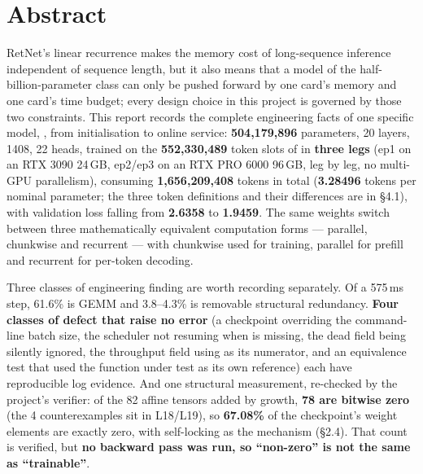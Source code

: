 \documentclass[11pt,openany]{article}
\begin{document}
\clearpage

\section*{Abstract}

RetNet's linear recurrence makes the memory cost of long-sequence inference independent of
sequence length, but it also means that a model of the half-billion-parameter class can only be
pushed forward by one card's memory and one card's time budget; every design choice in this
project is governed by those two constraints. This report records the complete engineering facts
of one specific model, , from initialisation to online
service: \textbf{504{,}179{,}896} parameters, 20 layers,  1408, 22 heads, trained
on the \textbf{552{,}330{,}489} token slots of  in \textbf{three
legs} (ep1 on an RTX 3090 24\,GB, ep2/ep3 on an RTX PRO 6000 96\,GB, leg by leg, no multi-GPU
parallelism), consuming \textbf{1{,}656{,}209{,}408} tokens in total (\textbf{3.28496} tokens per
nominal parameter; the three token definitions and their differences are in \S4.1), with
validation loss falling from \textbf{2.6358} to \textbf{1.9459}. The same weights switch between
three mathematically equivalent computation forms --- parallel, chunkwise and recurrent --- with
chunkwise used for training, parallel for prefill and recurrent for per-token decoding.

Three classes of engineering finding are worth recording separately. Of a 575\,ms step, 61.6\% is
GEMM and 3.8--4.3\% is removable structural redundancy. \textbf{Four classes of defect that raise
no error} (a checkpoint overriding the command-line batch size, the scheduler not resuming when
 is missing, the dead  field being silently ignored, the
throughput field using  as its numerator, and an equivalence test that used the
function under test as its own reference) each have reproducible log evidence. And one structural
measurement, re-checked by the project's verifier: of the 82 affine tensors added by growth,
\textbf{78 are bitwise zero} (the 4 counterexamples sit in L18/L19), so \textbf{67.08\%} of the
checkpoint's weight elements are exactly zero, with  self-locking as the
mechanism (\S2.4). That count is verified, but \textbf{no backward pass was run, so ``non-zero''
is not the same as ``trainable''}.
\end{document}
